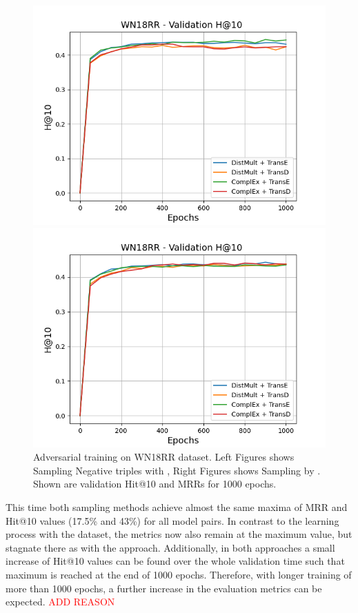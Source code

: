 \begin{figure}
\begin{minipage}{.5\textwidth}
    \end{minipage}
    \begin{minipage}{.5\textwidth}
      \centering
      \includegraphics[width=0.9\linewidth]{figures/results/gan_train/not_pretrained/uncertainty/max/entropy/wn18rr/uncertainty_wn18rr_hit10.png}
    \end{minipage}%
    \begin{minipage}{.5\textwidth}
      \centering
      \includegraphics[width=0.9\linewidth]{figures/results/gan_train/not_pretrained/uncertainty/max_distribution/entropy/wn18rr/uncertainty_wn18rr_hit10.png}
    \end{minipage}%
    \caption{Adversarial training on \textsc{WN18RR} dataset. 
    Left Figures shows Sampling Negative triples with \usmax, Right Figures shows Sampling by \ussoftmax.
    Shown are validation Hit@10 and MRRs for 1000 epochs.}
    \label{fig:advtrain_wn18rr_usmax_ussoftmax}
\end{figure}
This time both sampling methods achieve almost the same maxima of MRR and Hit@10 values (17.5\% and 43\%) for all model pairs.
In contrast to the learning process with the \umls dataset, the metrics now also \usmax remain at the maximum value, but stagnate there as with the \ussoftmax approach.
Additionally, in both approaches a small increase of Hit@10 values can be found over the whole validation time such that maximum is reached at the end of 1000 epochs.
Therefore, with longer training of more than 1000 epochs, a further increase in the evaluation metrics can be expected.
\textcolor{red}{ADD REASON}

